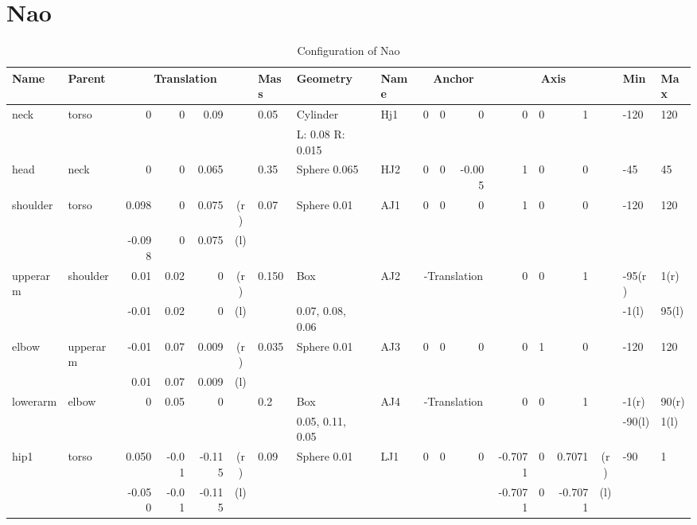 \section{Nao}
\begin{landscape}
\begin{table}
  \centering
  \label{table:nao-conf}
  \caption{Configuration of Nao}
  \newcommand{\threegrid}[1]{\multicolumn{3}{c|}{#1}}
  \newcommand{\fourgrid}[1]{\multicolumn{4}{c|}{#1}}
  \begin{tabular}{|l|l|r@{,}r@{,}r@{}c|l|l|l|r@{,}r@{,}r|r@{,}r@{,}r@{}c|l|l|}
    \hline
    {\bf Name} & {\bf Parent} & \fourgrid{\bf Translation} &
    {\bf Mass} & {\bf Geometry} & {\bf Name} & \threegrid{\bf
      Anchor} & \fourgrid{\bf Axis} & {\bf Min} & {\bf Max} \\
    \hline
    neck & torso & 0&0&0.09& & 0.05 & Cylinder & Hj1 & 0&0&0 & 0&0&1& &
    -120 & 120\\
    & & \fourgrid{} & & L: 0.08 R: 0.015 & & \threegrid{} & \fourgrid{} & &\\
    \hline
    head & neck & 0&0&0.065& & 0.35 & Sphere 0.065 & HJ2 & 0&0&-0.005 &
    1&0&0& & -45 & 45\\
    \hline
    shoulder & torso & 0.098&0&0.075&(r)  & 0.07 & Sphere 0.01& AJ1 &
    0&0&0 & 1&0&0& & -120 & 120 \\
    & & -0.098 & 0 & 0.075&(l) & & & & \threegrid{} & \fourgrid{} & & \\
    \hline
    upperarm & shoulder & 0.01&0.02&0&(r) & 0.150 &
    Box & AJ2 & \threegrid{-Translation} & 0&0&1& & -95(r) & 1(r)  \\
    & & -0.01 & 0.02 & 0&(l) & & 0.07, 0.08, 0.06 & & \threegrid{} & \fourgrid{} & -1(l) & 95(l) \\
    \hline
    elbow & upperarm & -0.01&0.07&0.009&(r) &
    0.035 & Sphere 0.01 & AJ3 & 0&0&0 & 0&1&0& & -120 & 120 \\
    & & 0.01 & 0.07 & 0.009&(l) & & & & \threegrid{} & \fourgrid{} & &\\
    \hline
    lowerarm & elbow & 0&0.05&0& & 0.2 & Box & AJ4 &
    \threegrid{-Translation} & 0&0&1& & -1(r) & 90(r) \\
    & & \fourgrid{} & & 0.05, 0.11, 0.05 & & \threegrid{} & \fourgrid{} & -90(l) & 1(l) \\
    \hline
    hip1 & torso & 0.050&-0.01&-0.115&(r) &
    0.09 & Sphere 0.01 & LJ1 & 0&0&0 & -0.7071&0&0.7071&(r)  & -90 & 1 \\
    & & -0.050 & -0.01 & -0.115&(l) & & & & \threegrid{} & -0.7071&0&-0.7071&(l) & &\\

\end{tabular}
\end{table}
\end{landscape}
